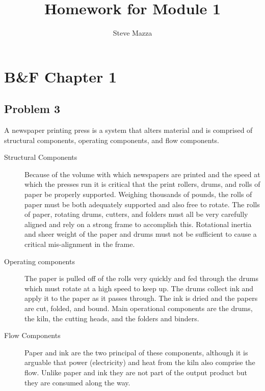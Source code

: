 \documentclass[letterpaper,10pt]{article}
\title{Homework for Module 1}
\author{Steve Mazza}
\begin{document}
\maketitle

\section*{B\&F Chapter 1}
\subsection*{Problem 3}
A newspaper printing press is a system that alters material and is comprised of structural components, operating components, and flow components.
\begin{description}
\item[Structural Components] Because of the volume with which newspapers are printed and the speed at which the presses run it is critical that the print rollers, drums, and rolls of paper be properly supported.  Weighing thousands of pounds, the rolls of paper must be both adequately supported and also free to rotate.  The rolls of paper, rotating drums, cutters, and folders must all be very carefully aligned and rely on a strong frame to accomplish this.  Rotational inertia and sheer weight of the paper and drums must not be sufficient to cause a critical mis-alignment in the frame.
\item[Operating components]   The paper is pulled off of the rolls very quickly and fed through the drums which must rotate at a high speed to keep up.  The drums collect ink and apply it to the paper as it passes through.  The ink is dried and the papers are cut, folded, and bound.  Main operational components are the drums, the kiln, the cutting heads, and the folders and binders.
\item[Flow Components]  Paper and ink are the two principal of these components, although it is arguable that power (electricity) and heat from the kiln also comprise the flow.  Unlike paper and ink they are not part of the output product but they are consumed along the way.
\end{description}
\end{document}
